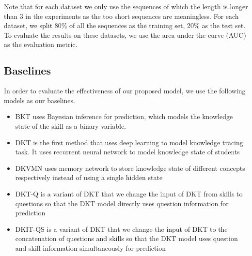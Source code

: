 Note that for each dataset we only use the sequences of which the length is longer than 3 in the experiments as the too short sequences are meaningless. For each dataset, we split 80\% of all the sequences as the training set, 20\% as the test set. To evaluate the results on these datasets, we use the area under the curve (AUC) as the evaluation metric.

\subsection{Baselines}
In order to evaluate the effectiveness of our proposed model, we use the following models as our baselines.
\begin{itemize}
	\item BKT uses Bayesian inference for prediction, which models the knowledge state of the skill as a binary variable.
	\item DKT is the first method that uses deep learning to model knowledge tracing task. It uses recurrent neural network to model knowledge state of students
	\item DKVMN uses memory network to store knowledge state of different concepts respectively instead of using a single hidden state
	\item DKT-Q is a variant of DKT that we change the input of DKT from skills to questions so that the DKT model directly uses question information for prediction
	\item DKIT-QS is a variant of DKT that we change the input of DKT to the concatenation of questions and skills so that the DKT model uses question and skill information simultaneously for prediction
\end{itemize}




